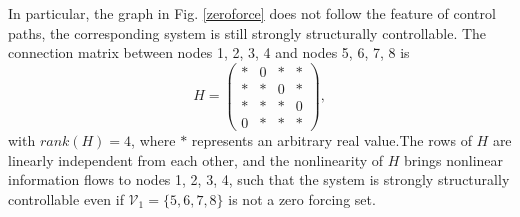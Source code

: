 \documentclass[a4paper,11pt]{article}
\begin{document}
{%
 In particular, the graph in Fig. \ref{zeroforce} does not follow the feature of control paths, the corresponding system is still strongly structurally controllable. The connection matrix between nodes 1, 2, 3, 4 and nodes 5, 6, 7, 8 is
\begin{equation*}\label{connection}
  H=\left(\begin{array}{*{20}{c}}
  {*}&0&{*}&{*}\\
  {*}&*&{0}&{*}\\
  {*}&*&{*}&{0}\\
  {0}&*&{*}&{*}
  \end{array}\right),
\end{equation*}
with $rank(H)=4$, where $*$ represents an arbitrary real value.The rows of $H$ are linearly independent from each other, and the nonlinearity of $H$ brings nonlinear information flows to nodes 1, 2, 3, 4, such that the system is strongly structurally controllable even if $\mathcal{V}_1=\{5,6,7,8\}$ is not a zero forcing set. %

}
\end{document}
